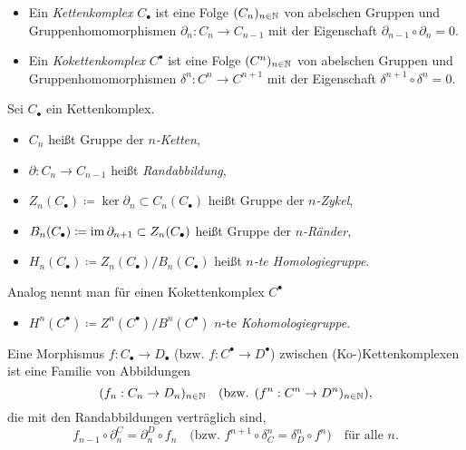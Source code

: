 \documentclass{cheat-sheet}
\newcommand{\CC}[1]{{#1}_{\bullet}} %
\newcommand{\CCC}[1]{{#1}^{\bullet}} %
\begin{document}

\begin{defn}
  \begin{itemize}
    \item Ein \emph{Kettenkomplex} $\CC{C}$ ist eine Folge $(C_n)_{n \in \mathbb{N}}$ von abelschen Gruppen und Gruppenhomomorphismen $\partial_n : C_n \to C_{n-1}$ mit der Eigenschaft $\partial_{n-1} \circ \partial_n = 0$.
    \item Ein \emph{Kokettenkomplex} $\CCC{C}$ ist eine Folge $(C^n)_{n \in \mathbb{N}}$ von abelschen Gruppen und Gruppenhomomorphismen $\delta^n : C^n \to C^{n+1}$ mit der Eigenschaft $\delta^{n+1} \circ \delta^n = 0$.
  \end{itemize}
\end{defn}

\begin{defn}
  Sei $\CC{C}$ ein Kettenkomplex.
  \begin{itemize}
    \item $C_n$ heißt Gruppe der \emph{$n$-Ketten},
    \item $\partial : C_n \to C_{n-1}$ heißt \emph{Randabbildung},
    \item $Z_n(\CC{C}) \coloneqq \ker \partial_n \subset C_n(\CC{C})$ heißt Gruppe der \emph{$n$-Zykel},
    \item $B_n(\CC{C}) \coloneqq \im \partial_{n+1} \subset Z_n(\CC{C})$ heißt Gruppe der \emph{$n$-Ränder},
    \item $H_n(\CC{C}) \coloneqq Z_n(\CC{C}) / B_n(\CC{C})$ heißt \emph{$n$-te Homologiegruppe}.
  \end{itemize}
  Analog nennt man für einen Kokettenkomplex $\CCC{C}$
  \begin{itemize}
    \item $H^n(\CCC{C}) \coloneqq Z^n(\CCC{C}) / B^n(\CCC{C})$ $n$-te \emph{Kohomologiegruppe}.
  \end{itemize}
\end{defn}

\begin{defn}
  Eine Morphismus $f : \CC{C} \to \CC{D}$ (bzw. $f : \CCC{C} \to \CCC{D}$) zwischen (Ko-)Kettenkomplexen ist eine Familie von Abbildungen
  \[
    (f_n : C_n \to D_n)_{n \in \mathbb{N}} \quad
    \text{(bzw. $(f^n : C^n \to D^n)_{n \in \mathbb{N}}$),}
  \]
  die mit den Randabbildungen verträglich sind, \dh{}
  \[
    f_{n-1} \circ \partial^C_n = \partial^D_n \circ f_n \quad
    \text{(bzw. $f^{n+1} \circ \delta_C^n = \delta_D^n \circ f^n$)} \quad
    \text{für alle $n$.}
  \]
\end{defn}
\end{document}
